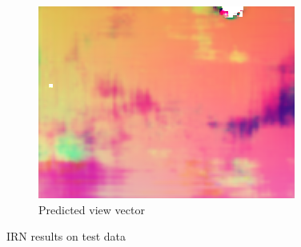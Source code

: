\begin{figure}
\begin{subfigure}{0.32\linewidth}
    \includegraphics[width=\linewidth]{praca/images/AI46_009_Cam01.VRayLightSelect_RE_L0.view_output.png}
    \caption{Predicted view vector}
  \end{subfigure}
  \caption[IRN results - test data]{IRN results on test data}
  \label{fig:irn-test}
\end{figure}
